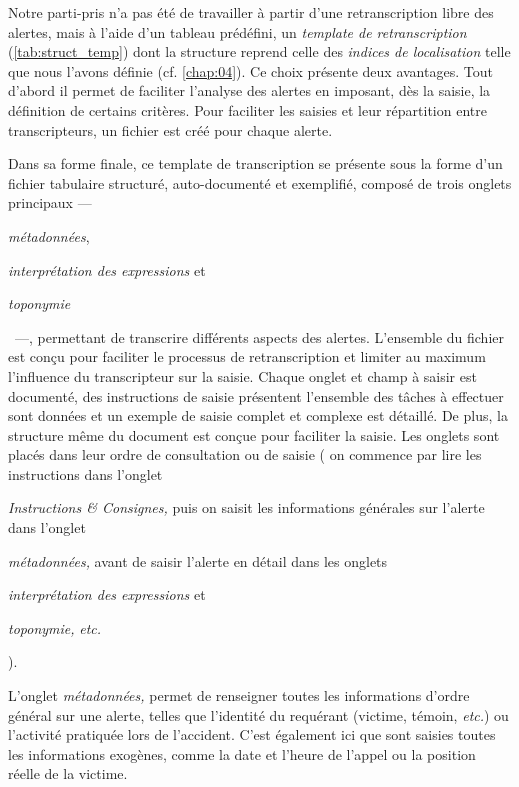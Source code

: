Notre parti-pris n'a pas été de travailler à partir d'une
retranscription libre des alertes, mais à l'aide d'un tableau
prédéfini, un \emph{template de retranscription}
(\autoref{tab:struct_temp}) dont la structure reprend celle des
\emph{indices de localisation} telle que nous l'avons définie
(cf. \autoref{chap:04}). Ce choix présente deux avantages. Tout
d'abord il permet de faciliter l'analyse des alertes en imposant, dès
la saisie, la définition de certains critères. Pour faciliter les
saisies et leur répartition entre transcripteurs, un fichier est créé
pour chaque alerte.

Dans sa forme finale, ce template de transcription se présente sous la
forme d'un fichier tabulaire structuré, auto-documenté et exemplifié,
composé de trois onglets principaux
%
---~\begin{enumerate*}[label=(\alph*)]
\item \emph{métadonnées},
\item \emph{interprétation des expressions} et
\item \emph{toponymie}
\end{enumerate*}~---,
%
permettant de transcrire différents aspects des alertes. L'ensemble du
fichier est conçu pour faciliter le processus de retranscription et
limiter au maximum l'influence du transcripteur sur la saisie. Chaque
onglet et champ à saisir est documenté, des instructions de saisie
présentent l'ensemble des tâches à effectuer sont données et un
exemple de saisie complet et complexe est détaillé. De plus, la
structure même du document est conçue pour faciliter la saisie. Les
onglets sont placés dans leur ordre de consultation ou de saisie (\eg
on commence par lire les instructions dans l'onglet
%
\begin{enumerate*}[label=(\arabic*)]
\item \emph{Instructions \& Consignes,} puis on saisit les
  informations générales sur l'alerte dans l'onglet
\item \emph{métadonnées,} avant de saisir l'alerte en détail dans les
  onglets
\item \emph{interprétation des expressions} et
\item \emph{toponymie,} \emph{etc.}
\end{enumerate*}).

L'onglet \emph{métadonnées,} permet de renseigner toutes les
informations d'ordre général sur une alerte, telles que l'identité du
requérant (victime, témoin, \emph{etc.}) ou l’activité pratiquée lors
de l'accident. C'est également ici que sont saisies toutes les
informations exogènes, comme la date et l'heure de l'appel ou la
position réelle de la victime.

